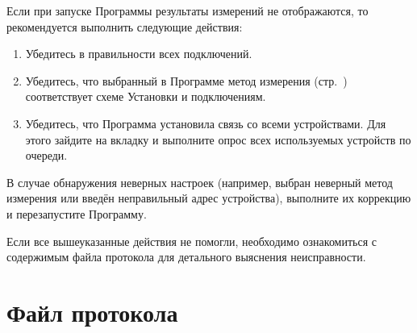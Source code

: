 \documentclass[12pt, a4paper, twocolumn]{report}
\begin{document}
Если при запуске Программы результаты измерений не отображаются, то рекомендуется выполнить следующие действия:

\begin{enumerate}
\item Убедитесь в правильности всех подключений.
\item Убедитесь, что выбранный в Программе метод измерения (стр.~\pageref{sec_r_measure_config}) соответствует схеме Установки и подключениям.
\item Убедитесь, что Программа установила связь со всеми устройствами. Для этого зайдите на вкладку  и выполните опрос всех используемых устройств по очереди.
\end{enumerate}

В случае обнаружения неверных настроек (например, выбран неверный метод измерения или введён неправильный адрес устройства), выполните их коррекцию и перезапустите Программу.

Если все вышеуказанные действия не помогли, необходимо ознакомиться с содержимым файла протокола для детального выяснения неисправности.

\section{Файл протокола}


\end{document}
